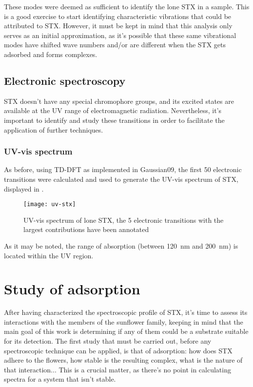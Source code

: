 These modes were deemed as sufficient to identify the lone STX in a sample.
This is a good exercise to start identifying characteristic vibrations that could be attributed to STX.
However, it must be kept in mind that this analysis only serves as an initial approximation, as it's possible that these same vibrational modes have shifted wave numbers and/or are different when the STX gets adsorbed and forms complexes.

\subsection{Electronic spectroscopy}
STX doesn't have any special chromophore groups, and its excited states are available at the UV range of electromagnetic radiation.
Nevertheless, it's important to identify and study these transitions in order to facilitate the application of further techniques.

\subsubsection{UV-vis spectrum}
As before, using TD-DFT as implemented in Gaussian09, the first 50 electronic transitions were calculated and used to generate the UV-vis spectrum of STX, displayed in .

\begin{figure}
    \texttt{[image: uv-stx]}
    \caption[UV-vis spectrum of lone STX]{UV-vis spectrum of lone STX, the 5 electronic transitions with the largest contributions have been annotated}
\end{figure}

As it may be noted, the range of absorption (between \SI{120}{\nano\metre} and \SI{200}{\nano\metre}) is located within the UV region.

\section{Study of adsorption}

After having characterized the spectroscopic profile of STX, it's time to assess its interactions with the members of the sunflower family, keeping in mind that the main goal of this work is determining if any of them could be a substrate suitable for its detection.
The first study that must be carried out, before any spectroscopic technique can be applied, is that of adsorption: how does STX adhere to the flowers, how stable is the resulting complex, what is the nature of that interaction...
This is a crucial matter, as there's no point in calculating spectra for a system that isn't stable.

